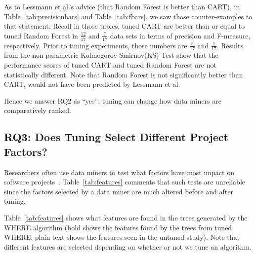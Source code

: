 \documentclass[final,twocolumn,5p]{elsarticle}
\newcommand{\tab}[1]{Table~\ref{tab:#1}}
\begin{document}
As to Lessmann et al.'s advice (that Random Forest is better than 
CART),  
in \tab{precisionbars} and \tab{fbars}, we saw those counter-examples
to that statement.
Recall in those tables,
tuned CART are better than or equal
to tuned Random Forest in $\frac{12}{17}$ and $\frac{7}{17}$ data sets in
terms of precision and F-measure, respectively. Prior to tuning experiments, those
numbers are $\frac{5}{17}$ and $\frac{1}{17}$. Results from the non-parametric
Kolmogorov-Smirnov(KS) Test show that the performance 
scores of tuned CART and tuned Random Forest are not statistically different.
Note that Random Forest is  not significantly better than CART, would not have been
predicted by   Lessmann et al.
  

Hence we answer RQ2 as ``yes'': tuning can change how  data miners are comparatively ranked.
 










 \subsection{RQ3: Does Tuning Select Different Project Factors? }\label{sect:import}


Researchers often use data miners to  test what factors have most impact on software projects~\cite{bell2013limited,rahman2013how,me02k,Moser:2008,zimmermann2007predicting,herzig2013predicting}. 
\tab{features} comments that such tests are unreliable since the factors selected by a data miner are much altered before and 
after tuning.

\tab{features} shows what features are found in the trees generated by the WHERE algorithm
(bold shows the features found by the trees from tuned WHERE; plain text shows the features seen
in the untuned study). Note that different features are selected depending on whether or not
we tune an algorithm.
\end{document}
